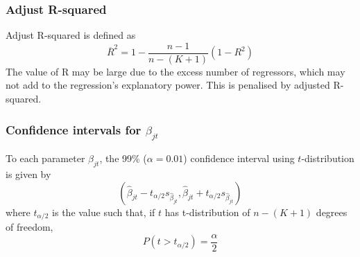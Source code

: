 \documentclass[12pt]{article}
\begin{document}
\subsubsection{{Adjust R-squared}} Adjust R-squared is defined as $$\overline{R} ^2=1-\frac{n-1}{n-(K+1)}(1-R^2)$$
The value of R may be large due to the excess number of regressors, which may not add to the regression's explanatory power. This is penalised by adjusted R-squared. 

\subsubsection{Confidence intervals for $\beta_{jt}$}
To each parameter $\beta_{jt}$, the 99\% ($\alpha = 0.01$) confidence interval using $t$-distribution is given by
$$(\hat \beta_{jt}-t_{\alpha/2}s_{\hat \beta_{jt}}, \hat \beta_{jt}+t_{\alpha/2}s_{\hat \beta_{jt}})$$
where $t_{\alpha/2}$ is the value such that, if $t$ has t-distribution of $n-(K+1)$ degrees of freedom, 
$$P(t>t_{\alpha/2})=\frac{\alpha}{2}$$
\end{document}
